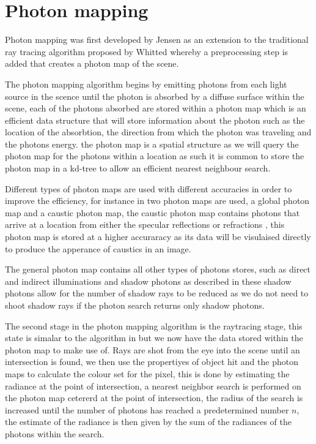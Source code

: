 \section{Photon mapping}
Photon mapping was first developed by Jensen \cite{Jensen95b} as an extension to the traditional ray
tracing algorithm proposed by Whitted \cite{whitted79a} whereby a preprocessing step is added that
creates a photon map of the scene.

The photon mapping algorithm begins by emitting photons from each light source in the scence until
the photon is absorbed by a diffuse surface within the scene, each of the photons absorbed are stored within a photon map
which is an efficient data structure that will store information about the photon such as the
location of the absorbtion, the direction from which the photon was traveling and the photons
energy. the photon map is a spatial structure as we will query the photon map for the photons
within a location as such it is common to store the photon map in a kd-tree to allow an efficient
nearest neighbour search.

Different types of photon maps are used with different accuracies in order to
improve the efficiency, for instance in \cite{Jensen96a} two photon maps are used, a global photon
map and a caustic photon map, the caustic photon map contains photons that arrive at a location from
either the specular reflections or refractions , this photon map is stored at a higher
accuraracy as its data will be visulaised directly to produce the apperance of caustics in an image.

The general photon map contains all other types of photons stores, such as direct and indirect
illuminations and shadow photons as described in \cite{Jensen95c, Jensen96a} these shadow photons
allow for the number of shadow rays to be reduced as we do not need to shoot shadow rays if the
photon search returns only shadow photons.

The second stage in the photon mapping algorithm is the raytracing stage, this state is simalar
to the algorithm in \cite{whitted79a} but we now have the data stored within the photon map to make
use of. Rays are shot from the eye into the scene until an intersection is found, we then use
the propertiyes of object hit and the photon maps to calculate the colour set for the pixel, this
is done by estimating the radiance at the point of intersection, a nearest neighbor search is
performed on the photon map cetererd at the point of intersection, the radius of the search is
increased until the number of photons has reached a predetermined number $n$, the estimate of the
radiance is then given by the sum of the radiances of the photons within the search.

